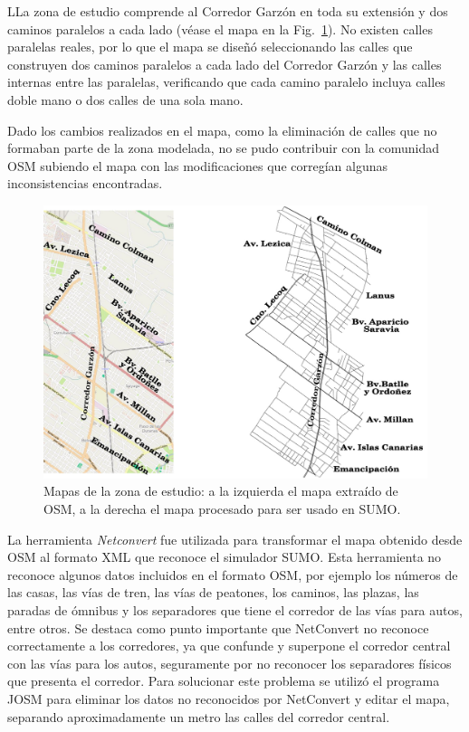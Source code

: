 LLa zona de estudio comprende al Corredor Garzón en toda su extensión y dos caminos paralelos a cada lado (véase el mapa en la Fig.~\ref{fig:mapa_osm_sumo}). No existen calles paralelas reales, por lo que el mapa se diseñó seleccionando las calles que construyen dos caminos paralelos a cada lado del Corredor Garzón y las calles internas entre las paralelas, verificando que cada camino paralelo incluya calles doble mano o dos calles de una sola mano.

Dado los cambios realizados en el mapa, como la eliminación de calles que no formaban parte de la zona modelada, no se pudo contribuir con la comunidad OSM subiendo el mapa con las modificaciones que corregían algunas inconsistencias encontradas.

\begin{figure}[!htb]
	\centering
	\includegraphics[width=0.7\linewidth]{Figures/mapa_osm_sumo_1}
	\caption[Mapa del Corredor Garzón]{Mapas de la zona de estudio: a la izquierda el mapa extraído de OSM, a la derecha el mapa procesado para ser usado en SUMO.}
	\label{fig:mapa_osm_sumo}
\end{figure}

La herramienta \emph{Netconvert} fue utilizada para transformar el mapa obtenido desde OSM al formato XML que reconoce el simulador SUMO. Esta herramienta no reconoce algunos datos incluidos en el formato OSM, por ejemplo los números de las casas, las vías de tren, las vías de peatones, los caminos, las plazas, las paradas de ómnibus y los separadores que tiene el corredor de las vías para autos, entre otros. Se destaca como punto importante que NetConvert no reconoce correctamente a los corredores, ya que confunde y superpone el corredor central con las vías para los autos, seguramente por no reconocer los separadores físicos que presenta el corredor. Para solucionar este problema se utilizó el programa JOSM para eliminar los datos no reconocidos por NetConvert y editar el mapa, separando aproximadamente un metro las calles del corredor central.

